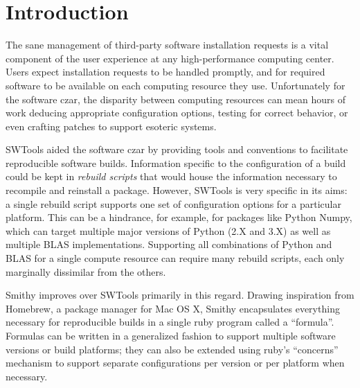 \documentclass{acm_proc_article-sp}
\begin{document}



\section{Introduction}

The sane management of third-party software installation requests is a vital
component of the user experience at any high-performance computing center. Users
expect installation requests to be handled promptly, and for required software
to be available on each computing resource they use. Unfortunately for the
software czar, the disparity between computing resources can mean hours of work
deducing appropriate configuration options, testing for correct behavior, or
even crafting patches to support esoteric systems.

SWTools\cite{swtools} aided the software czar by providing tools and conventions
to facilitate reproducible software builds. Information specific to the
configuration of a build could be kept in \textit{rebuild scripts} that would
house the information necessary to recompile and reinstall a package.  However,
SWTools is very specific in its aims: a single rebuild script supports one set
of configuration options for a particular platform. This can be a hindrance, for
example, for packages like Python Numpy, which can target multiple major
versions of Python (2.X and 3.X) as well as multiple BLAS implementations.
Supporting all combinations of Python and BLAS for a single compute resource can
require many rebuild scripts, each only marginally dissimilar from the others.

Smithy improves over SWTools primarily in this regard. Drawing inspiration from
Homebrew\cite{homebrew}, a package manager for Mac OS X, Smithy encapsulates
everything necessary for reproducible builds in a single ruby program called a
``formula''. Formulas can be written in a generalized fashion to support
multiple software versions or build platforms; they can also be extended using
ruby's ``concerns'' mechanism to support separate configurations per version or
per platform when necessary.
\end{document}
